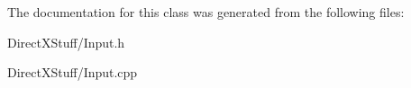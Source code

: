 The documentation for this class was generated from the following files\-:\begin{DoxyCompactItemize}
\item 
Direct\-X\-Stuff/Input.\-h\item 
Direct\-X\-Stuff/Input.\-cpp\end{DoxyCompactItemize}
